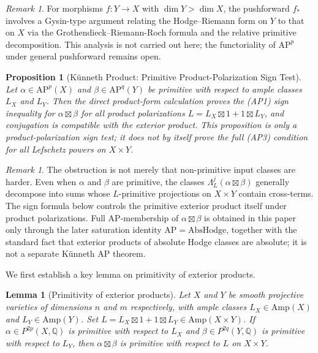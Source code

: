 \documentclass[aps,prd,twocolumn,superscriptaddress,nofootinbib]{revtex4-2}
\newtheorem{proposition}[theorem]{Proposition}
\newtheorem{lemma}[theorem]{Lemma}
\theoremstyle{definition}
\theoremstyle{remark}
\newtheorem{remark}[theorem]{Remark}
\begin{document}
\begin{remark}
For morphisms $f: Y \to X$ with $\dim Y > \dim X$, the pushforward $f_*$ involves a Gysin-type argument relating the Hodge--Riemann form on $Y$ to that on $X$ via the Grothendieck--Riemann-Roch formula and the relative primitive decomposition. This analysis is not carried out here; the functoriality of $\mathrm{AP}^p$ under general pushforward remains open.
\end{remark}

\begin{proposition}[Künneth Product: Primitive Product-Polarization Sign Test]
\label{prop:kunneth}
Let $\alpha \in \mathrm{AP}^p(X)$ and $\beta \in \mathrm{AP}^q(Y)$ be primitive with respect to ample classes $L_X$ and $L_Y$. Then the direct product-form calculation proves the (AP1) sign inequality for $\alpha \boxtimes \beta$ for all product polarizations $L = L_X \boxtimes 1 + 1 \boxtimes L_Y$, and conjugation is compatible with the exterior product. This proposition is only a product-polarization sign test; it does not by itself prove the full (AP3) condition for all Lefschetz powers on $X\times Y$.
\end{proposition}

\begin{remark}
The obstruction is not merely that non-primitive input classes are harder. Even when $\alpha$ and $\beta$ are primitive, the classes $\Lambda_L^j(\alpha\boxtimes\beta)$ generally decompose into sums whose $L$-primitive projections on $X\times Y$ contain cross-terms. The sign formula below controls the primitive exterior product itself under product polarizations. Full AP-membership of $\alpha\boxtimes\beta$ is obtained in this paper only through the later saturation identity $\mathrm{AP}=\mathrm{AbsHodge}$, together with the standard fact that exterior products of absolute Hodge classes are absolute; it is not a separate Künneth AP theorem.
\end{remark}

We first establish a key lemma on primitivity of exterior products.

\begin{lemma}[Primitivity of exterior products]
\label{lem:primitive_product}
Let $X$ and $Y$ be smooth projective varieties of dimensions $n$ and $m$ respectively, with ample classes $L_X \in \mathrm{Amp}(X)$ and $L_Y \in \mathrm{Amp}(Y)$. Set $L = L_X \boxtimes 1 + 1 \boxtimes L_Y \in \mathrm{Amp}(X \times Y)$. If $\alpha \in P^{2p}(X, \mathbb{Q})$ is primitive with respect to $L_X$ and $\beta \in P^{2q}(Y, \mathbb{Q})$ is primitive with respect to $L_Y$, then $\alpha \boxtimes \beta$ is primitive with respect to $L$ on $X \times Y$.
\end{lemma}
\end{document}
